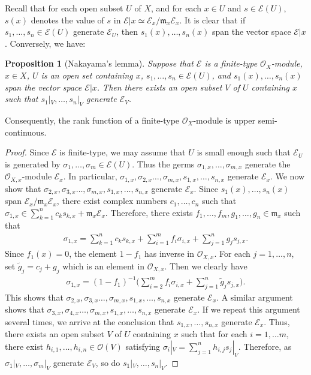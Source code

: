 \documentclass[12pt,b5paper,notitlepage]{report}
\theoremstyle{definition}
\theoremstyle{plain}
\newtheorem{pp}[df]{Proposition}
\newcommand{\fk}{\mathfrak}
\newcommand{\wtd}{\widetilde}
\newcommand{\scr}{\mathscr}
\numberwithin{equation}{section}
\begin{document}
Recall that for each open subset $U$ of $X$, and for each  $x\in U$ and $s\in\scr E(U)$, $s(x)$ denotes the value of $s$ in $\scr E|x\simeq \scr E_x/\fk m_x\scr E_x$. It is clear that if $s_1,\dots,s_n\in\scr E(U)$ generate $\scr E_U$, then $s_1(x),\dots,s_n(x)$ span the vector space $\scr E|x$. Conversely, we have:

\begin{pp}[Nakayama's lemma]\label{lb60}
Suppose that $\scr E$ is a finite-type $\scr O_X$-module, $x\in X$, $U$ is an open set containing $x$, $s_1,\dots,s_n\in\scr E(U)$, and $s_1(x),\dots,s_n(x)$ span the vector space $\scr E|x$. Then there exists an open subset $V$ of $U$ containing $x$ such that $s_1|_V,\dots,s_n|_V$ generate $\scr E_V$. 
\end{pp}

Consequently, the rank function of a finite-type $\scr O_X$-module is upper semi-continuous.

\begin{proof}
Since $\scr E$ is  finite-type, we may assume that $U$ is small enough such that $\scr E_U$ is generated  by $\sigma_1,\dots,\sigma_m\in\scr E(U)$. Thus the germs $\sigma_{1,x},\dots,\sigma_{m,x}$ generate the $\scr O_{X,x}$-module $\scr E_x$. In particular, $\sigma_{1,x},\sigma_{2,x}\dots,\sigma_{m,x},s_{1,x},\dots,s_{n,x}$ generate $\scr E_x$. We now show that $\sigma_{2,x},\sigma_{3,x}\dots,\sigma_{m,x},s_{1,x},\dots,s_{n,x}$ generate $\scr E_x$. Since $s_1(x),\dots,s_n(x)$ span $\scr E_x/\fk m_x\scr E_x$, there exist complex numbers $c_1,\dots,c_n$ such that $\sigma_{1,x}\in\sum_{k=1}^n c_ks_{k,x}+\fk m_x\scr E_x$. Therefore, there exists $f_1,\dots,f_m,g_1,\dots,g_n\in\fk m_x$ such that
\begin{align*}
\sigma_{1,x}=\sum_{k=1}^n c_ks_{k,x}+\sum_{i=1}^m f_i\sigma_{i,x}+\sum_{j=1}^n g_j s_{j,x}.
\end{align*}
Since $f_1(x)=0$, the element $1-f_1$ has inverse  in $\scr O_{X,x}$. For each $j=1,\dots,n$, set $\wtd g_j=c_j+g_j$ which is an element in $\scr O_{X,x}$. Then we clearly have
\begin{align*}
\sigma_{1,x}=(1-f_1)^{-1}\bigg(\sum_{i=2}^m f_i\sigma_{i,x}+\sum_{j=1}^n \wtd g_j s_{j,x}  \bigg).
\end{align*}
This shows that $\sigma_{2,x},\sigma_{3,x}\dots,\sigma_{m,x},s_{1,x},\dots,s_{n,x}$ generate $\scr E_x$. A similar argument shows that $\sigma_{3,x},\sigma_{4,x}\dots,\sigma_{m,x},s_{1,x},\dots,s_{n,x}$ generate $\scr E_x$. If we repeat this argument several times, we arrive at the conclusion that $s_{1,x},\dots,s_{n,x}$ generate $\scr E_x$. Thus, there exists an open subset $V$ of $U$ containing $x$ such that for each $i=1,\dots m$, there exist $h_{i,1},\dots,h_{i,n}\in\scr O(V)$ satisfying $\sigma_i|_V=\sum_{j=1}^n h_{i,j} s_j|_V$. Therefore, as $\sigma_1|_V,\dots,\sigma_m|_V$ generate  $\scr E_V$, so do $s_1|_V,\dots,s_n|_V$.
\end{proof}
\end{document}
